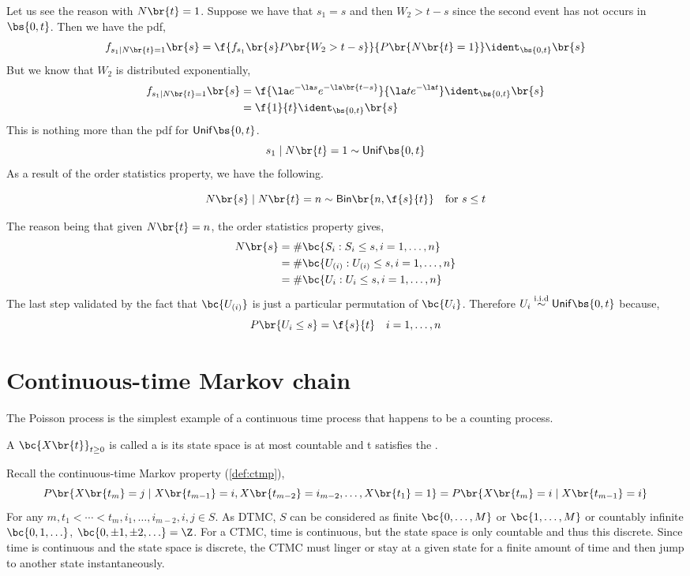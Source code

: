 \documentclass{article}
\newcommand{\Bi}{\mathsf{Bin}}
\newcommand{\Unif}{\mathsf{Unif}}
\begin{document}
    Let us see the reason with $N\br{t} = 1$. Suppose we have that $s_1 = s$ and then $W_2 > t - s$ since the second event has not occurs in $\bs{0, t}$. Then we have the pdf,
    \[ f_{s_1 \mid N\br{t} = 1} \br{s} = \f{f_{s_1}\br{s} P\br{W_2 > t - s}}{P\br{N\br{t} = 1}} \ident_{\bs{0, t}}\br{s} \]
    But we know that $W_2$ is distributed exponentially,
    \begin{align*}
    f_{s_1 \mid N\br{t} = 1} \br{s}
    &= \f{ \la e^{-\la s} e^{-\la\br{t - s}}}{\la t e^{-\la t}} \ident_{\bs{0, t}}\br{s} \\
    &= \f{1}{t}\ident_{\bs{0, t}}\br{s}
    \end{align*}
    This is nothing more than the pdf for $\Unif\bs{0, t}$.
    \[ s_1 \mid N\br{t} = 1 \sim \Unif\bs{0, t} \]
    As a result of the order statistics property, we have the following.
    \begin{theorem}
        \[ N\br{s} \mid N\br{t} = n \sim \Bi\br{n, \f{s}{t}} \quad \text{for } s \leq t\]
    \end{theorem}
    The reason being that given $N\br{t} = n$, the order statistics property gives,
    \begin{align*}
        N\br{s}
        &= \# \bc{S_i : S_i \leq s, i = 1, \ldots, n} \\
        &= \# \bc{U_{(i)} : U_{(i)} \leq s, i = 1, \ldots, n} \\
        &= \# \bc{U_{i} : U_{i} \leq s, i = 1, \ldots, n}
    \end{align*}
    The last step validated by the fact that $\bc{U_{(i)}}$ is just a particular permutation of $\bc{U_{i}}$. Therefore $U_i \stackrel{\text{i.i.d}}{\sim} \Unif\bs{0, t}$ because,
    \[ P\br{U_i \leq s} = \f{s}{t} \quad i = 1, \ldots, n \]

    \section{Continuous-time Markov chain}

    The Poisson process is the simplest example of a continuous time process that happens to be a counting process.
    \begin{definition}
        A  $\bc{X\br{t}}_{t \geq 0}$ is called a  is its state space is at most countable and t satisfies the .
    \end{definition}
    Recall the continuous-time Markov property (\cref{def:ctmp}),
    \[ P\br{X\br{t_m} = j \mid X\br{t_{m-1}} = i, X\br{t_{m-2}} = i_{m-2}, \ldots, X\br{t_1} = 1} = P\br{X\br{t_{m}} = i \mid X\br{t_{m-1}} = i} \]
    For any $m, t_1 < \cdots < t_m, i_1, \ldots, i_{m-2}, i, j \in S$. As DTMC, $S$ can be considered as finite $\bc{0, \ldots, M}$ or $\bc{1, \ldots, M}$ or countably infinite $\bc{0, 1, \ldots}$, $\bc{0, \pm 1, \pm 2, \ldots} = \Z$. For a CTMC, time is continuous, but the state space is only countable and thus this discrete. Since time is continuous and the state space is discrete, the CTMC must linger or stay at a given state for a finite amount of time and then jump to another state instantaneously.
\end{document}
